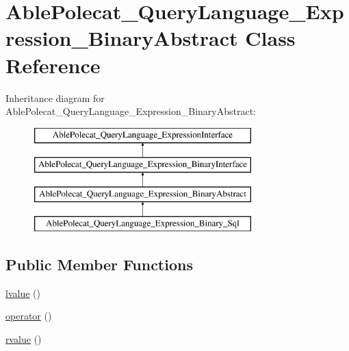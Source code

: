 \hypertarget{class_able_polecat___query_language___expression___binary_abstract}{}\section{Able\+Polecat\+\_\+\+Query\+Language\+\_\+\+Expression\+\_\+\+Binary\+Abstract Class Reference}
\label{class_able_polecat___query_language___expression___binary_abstract}
Inheritance diagram for Able\+Polecat\+\_\+\+Query\+Language\+\_\+\+Expression\+\_\+\+Binary\+Abstract\+:\begin{figure}[H]
\begin{center}
\leavevmode
\includegraphics[height=4.000000cm]{class_able_polecat___query_language___expression___binary_abstract}
\end{center}
\end{figure}
\subsection*{Public Member Functions}
\begin{DoxyCompactItemize}
\item 
\hyperlink{class_able_polecat___query_language___expression___binary_abstract_a3441a080c58bdf934f6f24e8c0aea673}{lvalue} ()
\item 
\hyperlink{class_able_polecat___query_language___expression___binary_abstract_a27d661679d6ca841f034118ea52159d8}{operator} ()
\item 
\hyperlink{class_able_polecat___query_language___expression___binary_abstract_ac9c038619eb9e83d210e7dbd81888824}{rvalue} ()
\end{DoxyCompactItemize}
